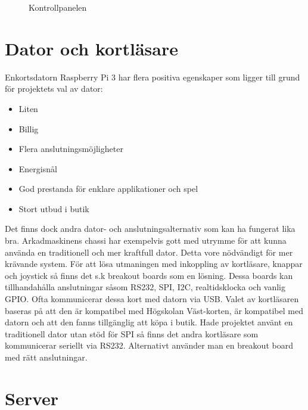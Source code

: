 \documentclass[12pt,fleqn,openany]{book} %
\begin{document}
\begin{figure}[h]
\centering{}
\caption{Kontrollpanelen}
\label{fig_kontrollpanel}
\end{figure}

\section{Dator och kortläsare}
Enkortsdatorn Raspberry Pi 3 har flera positiva egenskaper som ligger till grund för projektets val av dator:

\begin{itemize}
 \item Liten
 \item Billig
 \item Flera anslutningsmöjligheter
 \item Energisnål
 \item God prestanda för enklare applikationer och spel
 \item Stort utbud i butik
\end{itemize}
\bigskip

Det finns dock andra dator- och anslutningsalternativ som kan ha fungerat lika bra. Arkadmaskinens chassi har exempelvis gott med utrymme 
för att kunna använda en traditionell och mer kraftfull dator. Detta vore nödvändigt för mer krävande system. För att lösa utmaningen med 
inkoppling av kortläsare, knappar och joystick så finns det s.k breakout boards som en lösning. Dessa boards kan tillhandahålla anslutningar 
såsom RS232, SPI, I2C, realtidsklocka och vanlig GPIO. Ofta kommunicerar dessa kort med datorn via USB. Valet av kortläsaren baseras på att 
den är kompatibel med Högskolan Väst-korten, är kompatibel med datorn och att den fanns tillgänglig att köpa i butik. Hade projektet använt 
en traditionell dator utan stöd för SPI så finns det andra kortläsare som kommunicerar seriellt via RS232. Alternativt använder man en 
breakout board med rätt anslutningar.

\section{Server}
\end{document}
